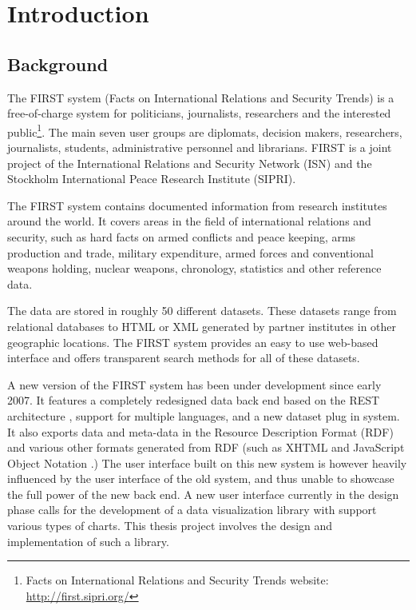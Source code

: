 \chapter{Introduction}
\section{Background}
The FIRST system (Facts on International Relations and Security Trends) is a free-of-charge system for politicians, journalists, researchers and the interested public\footnote{Facts on International Relations and Security Trends website: \url{http://first.sipri.org/}}. The main seven user groups are diplomats, decision makers, researchers, journalists, students, administrative personnel and librarians. FIRST is a joint project of the International Relations and Security Network (ISN) and the Stockholm International Peace Research Institute (SIPRI).

The FIRST system contains documented information from research institutes around the world. It covers areas in the field of international relations and security, such as hard facts on armed conflicts and peace keeping, arms production and trade, military expenditure, armed forces and conventional weapons holding, nuclear weapons, chronology, statistics and other reference data.

The data are stored in roughly 50 different datasets. These datasets range from relational databases to HTML or XML generated by partner institutes in other geographic locations. The FIRST system provides an easy to use web-based interface and offers transparent search methods for all of these datasets.

A new version of the FIRST system has been under development since early 2007. It features a completely redesigned data back end based on the REST architecture \cite{fielding00}, support for multiple languages, and a new dataset plug in system. It also exports data and meta-data in the Resource Description Format (RDF) \cite{rdf04} and various other formats generated from RDF (such as XHTML and JavaScript Object Notation \cite{crockford06}.) The user interface built on this new system is however heavily influenced by the user interface of the old system, and thus unable to showcase the full power of the new back end. A new user interface currently in the design phase calls for the development of a data visualization library with support various types of charts. This thesis project involves the design and implementation of such a library.


